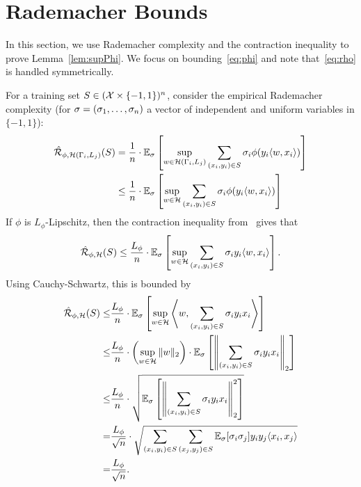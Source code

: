 
\section{Rademacher Bounds}
\label{sec:rademacher}
In this section, we use Rademacher complexity and the contraction inequality to prove Lemma~\ref{lem:supPhi}. We focus on bounding~\eqref{eq:phi} and note that~\eqref{eq:rho} is handled symmetrically.

For a training set $S \in (\mathcal{X} \times \{-1,1\})^n$, consider the empirical Rademacher complexity (for $\mathbf{\sigma}=(\mathbf{\sigma}_1,\dots,\mathbf{\sigma}_{n})$ a vector of independent and uniform variables in $\{-1,1\}$):
\begin{align*}
\hat{\mathcal{R}}_{\phi, \mathcal{H}(\Gamma_i,L_j)}(S) &= \frac{1}{n} \cdot \mathbb{E}_{\mathbf{\sigma}}\left[ \sup_{w \in \mathcal{H}(\Gamma_i,L_j)} \sum_{(x_i,y_i) \in S} \mathbf{\sigma}_i \phi(y_i \langle w, x_i \rangle )\right] \\
&\leq \frac{1}{n} \cdot \mathbb{E}_{\mathbf{\sigma}}\left[ \sup_{w \in \mathcal{H}} \sum_{(x_i,y_i) \in S} \mathbf{\sigma}_i \phi(y_i \langle w, x_i \rangle )\right]
\end{align*}
If $\phi$ is $L_\phi$-Lipschitz, then the contraction inequality from~\cite{ledoux1991probability} gives that
\[
\hat{\mathcal{R}}_{\phi, \mathcal{H}}(S) \leq \frac{L_\phi}{n} \cdot \mathbb{E}_{\mathbf{\sigma}}\left[ \sup_{w \in \mathcal{H}} \sum_{(x_i,y_i) \in S} \mathbf{\sigma}_i y_i \langle w, x_i \rangle  \right].
\]
Using Cauchy-Schwartz, this is bounded by
\begin{align*}
\hat{\mathcal{R}}_{\phi, \mathcal{H}}(S) \leq& \frac{L_\phi}{n} \cdot  \mathbb{E}_{\mathbf{\sigma}}\left[ \sup_{w \in \mathcal{H}}  \left\langle w, \sum_{(x_i,y_i) \in S}\mathbf{\sigma}_i y_i x_i \right\rangle  \right] \\
\leq& \frac{L_\phi}{n} \cdot \left(\sup_{w \in \mathcal{H}} \|w\|_2\right) \cdot \mathbb{E}_{\mathbf{\sigma}}\left[\left\| \sum_{(x_i,y_i) \in S}\mathbf{\sigma}_i y_i x_i\right\|_2 \right] \\
\leq& \frac{L_\phi}{n} \cdot \sqrt{\mathbb{E}_{\mathbf{\sigma}}\left[\left\| \sum_{(x_i,y_i) \in S}\mathbf{\sigma}_i y_i x_i\right\|_2^2 \right]}\\
=& \frac{L_\phi}{\sqrt{n}} \cdot \sqrt{\sum_{(x_i,y_i) \in S} \sum_{(x_j,y_j) \in S} \mathbb{E}_\sigma[\sigma_i \sigma_j] y_i y_j \langle x_i, x_j\rangle} \\
=& \frac{L_\phi}{\sqrt{n}}.
\end{align*}

